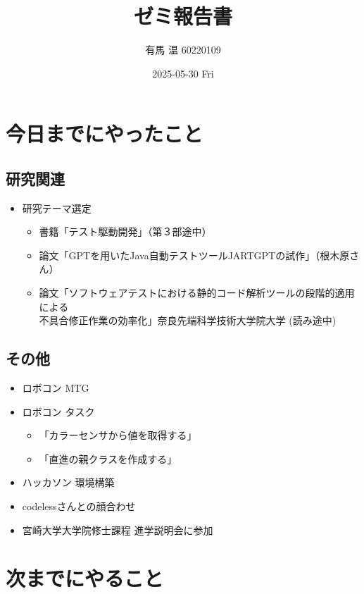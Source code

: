 \documentclass[uplatex, onecolumn, 10pt]{jsarticle}
\begin{document}
\title{\vspace{-40mm}\bf{\LARGE{ゼミ報告書}}}
\author{\vspace{-40mm}有馬 温 60220109}
\date{2025-05-30 Fri}
\maketitle


\section{今日までにやったこと}

\subsection*{研究関連} 
\begin{itemize}
	\item 研究テーマ選定
		\begin{itemize}
			\item 書籍「テスト駆動開発」（第３部途中）
			\item 論文「GPTを用いたJava自動テストツールJARTGPTの試作」（根木原さん）
			\item 論文「ソフトウェアテストにおける静的コード解析ツールの段階的適用による\\
            不具合修正作業の効率化」奈良先端科学技術大学院大学 (読み途中)
        \end{itemize}
\end{itemize}

\subsection*{その他}
\begin{itemize}
	\item ロボコン MTG
	\item ロボコン タスク
	\begin{itemize}
        \item 「カラーセンサから値を取得する」
        \item 「直進の親クラスを作成する」
    \end{itemize}
	\item ハッカソン 環境構築
	\item codelessさんとの顔合わせ
	\item 宮崎大学大学院修士課程 進学説明会に参加
\end{itemize}


\section{次までにやること}
\end{document}
